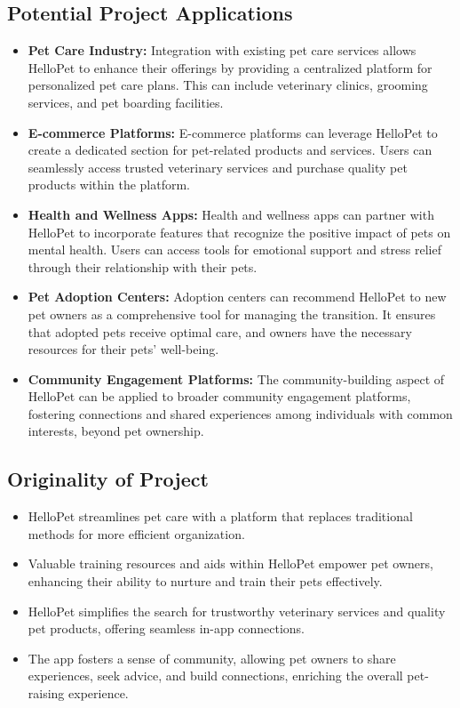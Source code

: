 \subsection{Potential Project Applications}
\begin{itemize}
    \item  \textbf{Pet Care Industry:}
    Integration with existing pet care services allows HelloPet to enhance their offerings by providing a centralized platform for personalized pet care plans. This can include veterinary clinics, grooming services, and pet boarding facilities.
    \item \textbf{E-commerce Platforms:}
    E-commerce platforms can leverage HelloPet to create a dedicated section for pet-related products and services. Users can seamlessly access trusted veterinary services and purchase quality pet products within the platform.
    \item \textbf{Health and Wellness Apps:}
Health and wellness apps can partner with HelloPet to incorporate features that recognize the positive impact of pets on mental health. Users can access tools for emotional support and stress relief through their relationship with their pets.
    \item \textbf{Pet Adoption Centers:}
Adoption centers can recommend HelloPet to new pet owners as a comprehensive tool for managing the transition. It ensures that adopted pets receive optimal care, and owners have the necessary resources for their pets' well-being.
    \item \textbf{Community Engagement Platforms:}
The community-building aspect of HelloPet can be applied to broader community engagement platforms, fostering connections and shared experiences among individuals with common interests, beyond pet ownership.
\end{itemize}


\subsection{Originality of Project}
\begin{itemize}
    \item HelloPet streamlines pet care with a platform that replaces traditional methods for more efficient organization.
    \item Valuable training resources and aids within HelloPet empower pet owners, enhancing their ability to nurture and train their pets effectively.
    \item HelloPet simplifies the search for trustworthy veterinary services and quality pet products, offering seamless in-app connections.
    \item The app fosters a sense of community, allowing pet owners to share experiences, seek advice, and build connections, enriching the overall pet-raising experience.
\end{itemize}